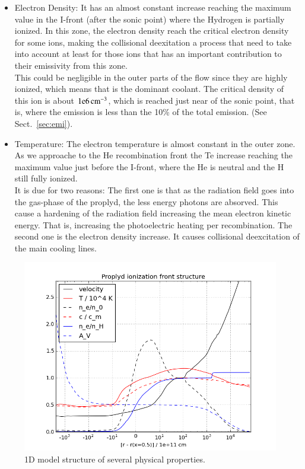 \documentclass[aaspp]{article}
\begin{document}
\begin{itemize}
  \item{Electron Density: It has an almost constant increase reaching the maximum value in the I-front (after the sonic point) where the Hydrogen is partially ionized. In this zone, the electron density reach the critical electron density for some ions, making the collisional deexitation a process that need to take into account at least for those ions that has an important contribution to their emissivity from this zone.\\ 
This could be negligible in the outer parts of the flow since they are highly ionized, which means that \oiii is the dominant coolant. The critical density of this ion is about $\rm 1e6 \, cm^{-3}$, which is reached just near of the sonic point, that is, where the \oiii emission is less than the 10\% of the total \oiii emission. (See Sect.~\ref{sec:emi}).}
  \item{Temperature: The electron temperature is almost constant in the outer zone. As we approache to the He recombination front the Te increase reaching the maximum value just before the I-front, where the He is neutral and the H still fully ionized. \\
It is due for two reasons: The first one is that as the radiation field goes into the gas-phase of the proplyd, the less energy photons are absorved. This cause a hardening of the radiation field increasing the mean electron kinetic energy. That is, increasing the photoelectric heating per recombination. The second one is the electron density increase. It causes collisional deexcitation of the main cooling lines.}
\end{itemize}

\begin{figure}[h]
  \centering
  \includegraphics[width=8.5 cm]{ifrac-vs-Rlog.png}
  \caption{1D model structure of several physical properties.} \label{fig:ifrac}
\end{figure}
\end{document}
